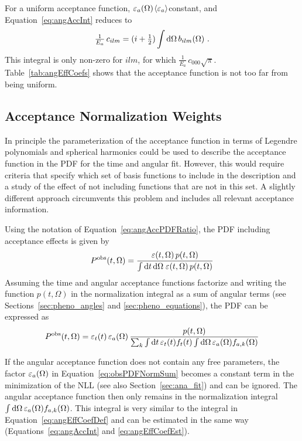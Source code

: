 For a uniform acceptance function, $\varepsilon_a(\Omega)$\texteq$\langle\varepsilon_a\rangle$\texteq constant, and Equation~\ref{eq:angAccInt} reduces to
\begin{equation}
  \tfrac{1}{E_a}\, c_{ilm} = (i+\tfrac{1}{2}) \int\mathrm{d}\Omega\,b_{ilm}(\Omega)\ .
\end{equation}
This integral is only non-zero for $i$\texteq$l$\texteq$m$, for which $\tfrac{1}{E_a}\,c_{000}$$\sqrt{\pi}$.
Table~\ref{tab:angEffCoefs} shows that the acceptance function is not too far from being uniform.


\subsection{Acceptance Normalization Weights}
\label{subsec:ana_angles_weights}

In principle the parameterization of the acceptance function in terms of Legendre polynomials and spherical harmonics could be used to
describe the acceptance function in the PDF for the time and angular fit. However, this would require criteria that specify which set of
basis functions to include in the description and a study of the effect of not including functions that are not in this set. A slightly
different approach circumvents this problem and includes all relevant acceptance information.

Using the notation of Equation~\ref{eq:angAccPDFRatio}, the PDF including acceptance effects is given by
\begin{equation}
  \label{eq:obsPDF}
  P^\text{obs}(t,\Omega) = \frac{\varepsilon(t,\Omega)\, p(t,\Omega)}{\int\mathrm{d} t\, \mathrm{d}\Omega\; \varepsilon(t,\Omega)\, p(t,\Omega)}
\end{equation}
Assuming the time and angular acceptance functions factorize and writing the function $p(t,\Omega)$ in the normalization integral as a sum
of angular terms (see Sections~\ref{sec:pheno_angles} and \ref{sec:pheno_equations}), the PDF can be expressed as
\begin{equation}
  \label{eq:obsPDFNormSum}
  P^\text{obs}(t,\Omega) = \varepsilon_t(t)\,\varepsilon_a(\Omega)\, \frac{p(t,\Omega)}{\sum_k \int\mathrm{d} t\, \varepsilon_t(t) f_t(t) \int\mathrm{d}\Omega\, \varepsilon_a(\Omega) f_{a,k}(\Omega)}
\end{equation}

If the angular acceptance function does not contain any free parameters, the factor $\varepsilon_a(\Omega)$ in Equation~\ref{eq:obsPDFNormSum} becomes a
constant term in the minimization of the NLL (see also Section~\ref{sec:ana_fit}) and can be ignored. The angular acceptance function then
only remains in the normalization integral $\int\mathrm{d}\Omega\, \varepsilon_a(\Omega) f_{a,k}(\Omega)$. This integral is very similar to the integral in
Equation~\ref{eq:angEffCoefDef} and can be estimated in the same way (Equations~\ref{eq:angAccInt} and \ref{eq:angEffCoefEst}).


